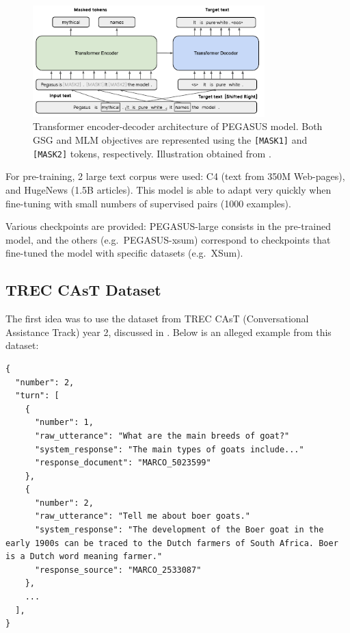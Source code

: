 \documentclass[a4paper, 10pt]{article}
\begin{document}
        \begin{figure}[!htb]
            \centering
            \includegraphics[width=0.8\textwidth]{Figures/pegasus.pdf}
            \caption{Transformer encoder-decoder architecture of PEGASUS model. Both GSG and MLM objectives are represented using the \texttt{[MASK1]} and \texttt{[MASK2]} tokens, respectively. Illustration obtained from \cite{Zhang2020b}.}
        \end{figure}
        
        For pre-training, 2 large text corpus were used: C4 (text from 350M Web-pages), and HugeNews (1.5B articles). This model is able to adapt very quickly when fine-tuning with small numbers of supervised pairs (1000 examples).
        
        Various checkpoints are provided: PEGASUS-large consists in the pre-trained model, and the others (e.g.\ PEGASUS-xsum) correspond to checkpoints that fine-tuned the model with specific datasets (e.g.\ XSum).
        
    \subsection{TREC CAsT Dataset}
        
        The first idea was to use the dataset from TREC CAsT (Conversational Assistance Track) year 2, discussed in \cite{Dalton2020}. Below is an alleged example from this dataset:

        \begin{lstlisting}[style=json]
{
  "number": 2,
  "turn": [
    {
      "number": 1,
      "raw_utterance": "What are the main breeds of goat?"
      "system_response": "The main types of goats include..."
      "response_document": "MARCO_5023599"
    },
    {
      "number": 2,
      "raw_utterance": "Tell me about boer goats."
      "system_response": "The development of the Boer goat in the early 1900s can be traced to the Dutch farmers of South Africa. Boer is a Dutch word meaning farmer."
      "response_source": "MARCO_2533087"
    },
    ...
  ],
}
        \end{lstlisting}
\end{document}
